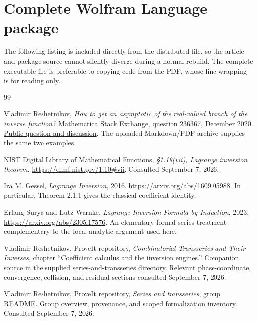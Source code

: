 \documentclass[11pt,a4paper]{article}
\numberwithin{equation}{section}
\theoremstyle{definition}
\begin{document}
\section{Complete Wolfram Language package}
\label{app:source}

The following listing is included directly from the distributed file,
so the article and package source cannot silently diverge during a
normal rebuild. The complete executable file is preferable to copying
code from the PDF, whose line wrapping is for reading only.



\begin{thebibliography}{99}

Vladimir Reshetnikov,
\emph{How to get an asymptotic of the real-valued branch of the inverse function?}
Mathematica Stack Exchange, question 236367, December 2020.
\href{https://mathematica.stackexchange.com/questions/236367/how-to-get-an-asymptotic-of-the-real-valued-branch-of-the-inverse-function}{Public question and discussion}.
The uploaded Markdown/PDF archive supplies the same two examples.

NIST Digital Library of Mathematical Functions,
\emph{\S1.10(vii), Lagrange inversion theorem}.
\url{https://dlmf.nist.gov/1.10#vii}.
Consulted September 7, 2026.

Ira M. Gessel,
\emph{Lagrange Inversion}, 2016.
\url{https://arxiv.org/abs/1609.05988}.
In particular, Theorem 2.1.1 gives the classical coefficient identity.

Erlang Surya and Lutz Warnke,
\emph{Lagrange Inversion Formula by Induction}, 2023.
\url{https://arxiv.org/abs/2305.17576}.
An elementary formal-series treatment complementary to the local analytic
argument used here.

Vladimir Reshetnikov, ProveIt repository,
\emph{Combinatorial Transseries and Their Inverses},
chapter ``Coefficient calculus and the inversion engines.''
\href{https://github.com/VladimirReshetnikov/ProveIt/blob/main/Analysis/FabiusFunction/docs/semi-formalized-research-frontiers/drafts/series-and-transseries/Combinatorial_Transseries_Inverses/Combinatorial_Transseries_Inverses.tex}{Companion source in the supplied series-and-transseries directory}.
Relevant phase-coordinate, convergence, collision, and residual sections
consulted September 7, 2026.

Vladimir Reshetnikov, ProveIt repository,
\emph{Series and transseries}, group README.
\href{https://github.com/VladimirReshetnikov/ProveIt/blob/main/Analysis/FabiusFunction/docs/semi-formalized-research-frontiers/drafts/series-and-transseries/README.md}{Group overview, provenance, and scoped formalization inventory}.
Consulted September 7, 2026.


\end{thebibliography}
\end{document}

